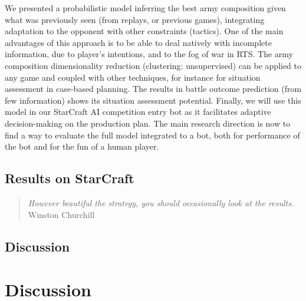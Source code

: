 We presented a probabilistic model inferring the best army composition given what was previously seen (from replays, or previous games), integrating adaptation to the opponent with other constraints (tactics). One of the main advantages of this approach is to be able to deal natively with incomplete information, due to player's intentions, and to the fog of war in RTS. The army composition dimensionality reduction (clustering: unsupervised) can be applied to any game and coupled with other techniques, for instance for situation assessment in case-based planning. The results in battle outcome prediction (from few information) shows its situation assessment potential. Finally, we will use this model in our StarCraft AI competition entry bot as it facilitates adaptive decision-making on the production plan. The main research direction is now to find a way to evaluate the full model integrated to a bot, both for performance of the bot and for the fun of a human player.


\subsection{Results on StarCraft}

\begin{quotation}\textit{
However beautiful the strategy, you should occasionally look at the results.
} Winston Churchill\end{quotation}

\subsection{Discussion}


\section{Discussion}

